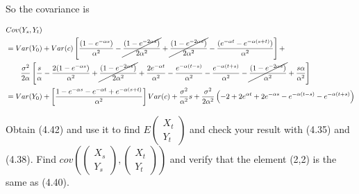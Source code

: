 \documentclass{article}
\numberwithin{questioncounter}{section}
\begin{document}
\begin{solution}
So the covariance is

\begin{align*}
& Cov(Y_{s}, Y_{t}) \\
&= Var(Y_{0}) + Var(c) \left[ \dfrac{(1 - e^{-\alpha s})}{\alpha^2} - \cancel{\dfrac{(1 - e^{-2 \alpha s})}{2\alpha^2}} + \cancel{\dfrac{(1 - e^{-2\alpha s})}{2\alpha^2}} - \dfrac{(e^{-\alpha t} - e^{-\alpha (s+t)})}{\alpha^2} \right] + \\
& \qquad \dfrac{\sigma^2}{2\alpha} \left[ \dfrac{s}{\alpha} - \dfrac{2(1 - e^{-\alpha s})}{\alpha^2} + \cancel{\dfrac{(1 - e^{-2\alpha s})}{2\alpha^2}} + \dfrac{2e^{-\alpha t}}{\alpha^2} - \dfrac{e^{-\alpha(t-s)}}{\alpha^2} - \dfrac{e^{-\alpha(t+s)}}{\alpha^2} - \cancel{\dfrac{(1 - e^{-2\alpha s})}{\alpha^2}} + \dfrac{s\alpha}{\alpha^2} \right] \\
&= Var(Y_{0}) + \left[ \dfrac{1 - e^{-\alpha s} - e^{-\alpha t} + e^{-\alpha(s+t)}}{\alpha^2}\right] Var(c) + \dfrac{\sigma^2}{\alpha^2} s + \dfrac{\sigma^2}{2\alpha^2} \left( -2 + 2e^{\alpha t} + 2e^{-\alpha s} - e^{-\alpha(t-s)} - e^{-\alpha(t+s)}\right)
\end{align*}

\end{solution}

\begin{question}
Obtain (4.42) and use it to find $E\left(\begin{array}{c} X_{t} \\ Y_{t} \end{array} \right)$ and check your result with (4.35) and (4.38). Find $cov\left(\left(\begin{array}{c} X_{s} \\ Y_{s} \end{array}\right), \left(\begin{array}{c} X_{t} \\ Y_{t} \end{array}\right)\right)$ and verify that the element (2,2) is the same as (4.40).
\end{question}
\end{document}
